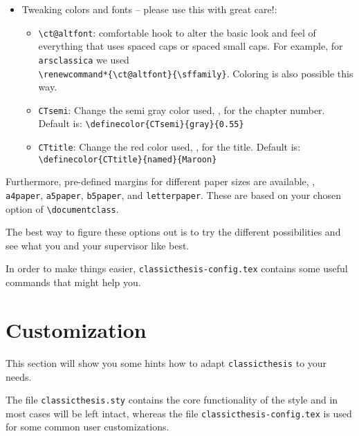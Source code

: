 \begin{itemize}
    \item Tweaking colors and fonts -- please use this with great care!:
        \begin{itemize}
            \item\verb|\ct@altfont|: comfortable hook to alter the basic look and feel of everything that uses spaced caps or spaced small caps. For example, for \texttt{arsclassica} we used \\ \verb|\renewcommand*{\ct@altfont}{\sffamily}|. Coloring is also possible this way.


            \item\texttt{CTsemi}: Change the semi gray color used, \eg, for the chapter number. Default is: \verb|\definecolor{CTsemi}{gray}{0.55}|

            \item\texttt{CTtitle}: Change the red color used, \eg, for the title. Default is: \verb|\definecolor{CTtitle}{named}{Maroon}|

        \end{itemize}

\end{itemize}

Furthermore, pre-defined margins for different paper sizes are available, \eg, \texttt{a4paper}, \texttt{a5paper}, \texttt{b5paper}, and \texttt{letterpaper}. These are based on your chosen option of \verb|\documentclass|.

The best way to figure these options out is to try the different
possibilities and see what you and your supervisor like best.

In order to make things easier, \texttt{classicthesis-config.tex}
contains some useful commands that might help you.


\section{Customization}\label{sec:custom}
This section will show you some hints how to adapt
\texttt{classicthesis} to your needs.

The file \texttt{classicthesis.sty}
contains the core functionality of the style and in most cases will
be left intact, whereas the file \texttt{classic\-thesis-config.tex}
is used for some common user customizations.

